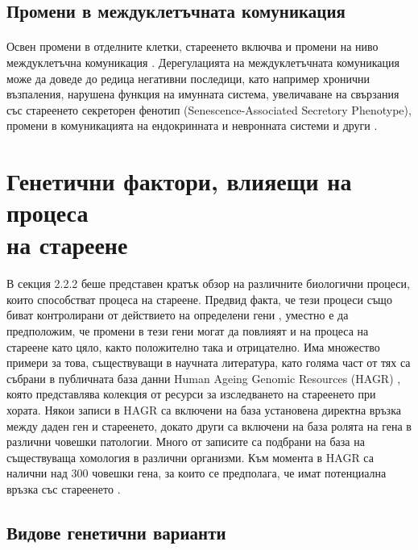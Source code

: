 \documentclass[pdftex,cyrillic,14pt,a4page,twoside,openright]{extreport}
\begin{document}
\subsection{Промени в междуклетъчната комуникация}
\paragraph{}
Освен промени в отделните клетки, стареенето включва и промени на ниво междуклетъчна комуникация \cite{lopezotin2013}. Дерегулацията на междуклетъчната комуникация може да доведе до редица негативни последици, като например хронични възпаления, нарушена функция на имунната система, увеличаване на свързания със стареенето секреторен фенотип (Senescence-Associated Secretory Phenotype), промени в комуникацията на ендокринната и невронната системи и други \cite{lagger2021}.

\section[Генетични фактори, влияещи на процеса на стареене]{Генетични фактори, влияещи на процеса\\ на стареене}
\paragraph{}
В секция 2.2.2 беше представен кратък обзор на различните биологични процеси, които способстват процеса на стареене. Предвид факта, че тези процеси също биват контролирани от действието на определени гени \cite{liu2004, jin2018, tominaga2002}, уместно е да предположим, че промени в тези гени могат да повлияят и на процеса на стареене като цяло, както положително така и отрицателно. Има множество примери за това, съществуващи в научната литература, като голяма част от тях са събрани в публичната база данни Human Ageing Genomic Resources (HAGR) \cite{tacutu2018}, която представлява колекция от ресурси за изследването на стареенето при хората. Някои записи в HAGR са включени на база установена директна връзка между даден ген и стареенето, докато други са включени на база ролята на гена в различни човешки патологии. Много от записите са подбрани на база на съществуваща хомология в различни организми. Към момента в HAGR са налични над 300 човешки гена, за които се предполага, че имат потенциална връзка със стареенето \cite{tacutu2018}.

\subsection[Видове генетични варианти]{Видове генетични варианти}
\end{document}
